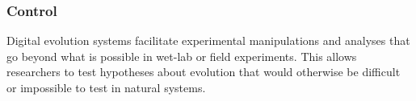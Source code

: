 



\subsubsection{Control}

Digital evolution systems facilitate experimental manipulations and analyses that go beyond what is possible in wet-lab or field experiments.
This allows researchers to test hypotheses about evolution that would otherwise be difficult or impossible to test in natural systems.








